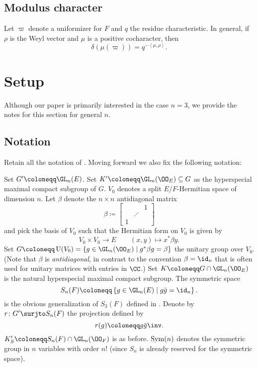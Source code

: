 \subsection{Modulus character}
Let $\varpi$ denote a uniformizer for $F$ and $q$ the residue characteristic.
In general, if $\rho$ is the Weyl vector and $\mu$ is a positive cocharacter, then
\[ \delta(\mu(\varpi)) = q^{- \left< \mu, \rho\right>}. \]

\section{Setup}
Although our paper is primarily interested in the case $n=3$,
we provide the notes for this section for general $n$.

\subsection{Notation}
Retain all the notation of .
Moving forward we also fix the following notation:
\begin{itemize}
  \ii Set $G' \coloneqq \GL_n(E)$.
  \ii Set $K' \coloneqq \GL_n(\OO_E) \subseteq G$ as the hyperspecial maximal compact subgroup of $G$.
  \ii $V_0$ denotes a split $E/F$-Hermitian space of dimension $n$.
  \ii Let $\beta$ denote the $n \times n$ antidiagonal matrix
  \[ \beta \coloneqq \begin{bmatrix} && 1 \\ & \iddots \\ 1 \end{bmatrix} \]
  and pick the basis of $V_0$ such that the Hermitian form on $V_0$ is given by
  \[ V_0 \times V_0 \to E \qquad (x,y) \mapsto x^\ast \beta y. \]
  \ii Set $G \coloneqq \U(V_0) = \{ g \in \GL_n(\OO_E) \mid g^\ast \beta g = \beta\}$
  the unitary group over $V_0$.
  (Note that $\beta$ is \emph{antidiagonal},
  in contrast to the convention $\beta = \id_n$
  that is often used for unitary matrices with entries in $\CC$.)
  \ii Set $K \coloneqq G \cap \GL_n(\OO_E)$ is the natural hyperspecial maximal compact subgroup.
  \ii The symmetric space
  \[ S_n(F) \coloneqq \left\{ g \in \GL_n(E) \mid g \bar g = \id_n \right\}. \]
  is the obvious generalization of $S_3(F)$ defined in .
  \ii Denote by $r \colon G' \surjto S_n(F)$ the projection defined by
  \[ r(g) \coloneqq g \bar{g}\inv. \]
  \ii $K'_S \coloneqq S_n(F) \cap \GL_n(\OO_F)$ is as before.
  \ii $\operatorname{Sym}(n)$ denotes the symmetric group in $n$ variables with order $n!$
  (since $S_n$ is already reserved for the symmetric space).
\end{itemize}

